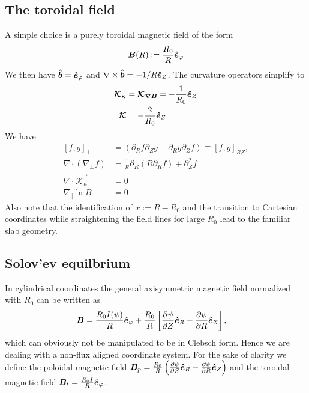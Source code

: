 \subsection{The toroidal field}\label{sec:toroidal}
A simple choice is a purely toroidal magnetic field of the form %
\begin{align}
  {\boldsymbol{B}}(R) := \frac{R_0}{R} \bm{\hat{e}}_\varphi
  \label{}
\end{align}
We then have $\bm{\hat{b}} = \bm{\hat{e}}_\varphi$ and $\nabla\times\bm{\hat{b}} = -1/R\bm{\hat{e}}_Z$. The curvature operators simplify to
\begin{align}
  {\boldsymbol{ \mathcal K_\kappa}} &= {\boldsymbol{ \mathcal K_{\nabla B}}} = -\frac{1}{R_0} \bm{\hat{e}}_Z \\
{\boldsymbol{ \mathcal K}} &= -\frac{2}{R_0}\bm{\hat{e}}_Z
  \label{}
\end{align}
We have
\begin{subequations}
\begin{align}
    [f, g]_\perp &= (\partial_R f\partial_Z g - \partial_R g\partial_Z f) \equiv [f, g]_{RZ}, \\
    \nabla \cdot(\nabla_\perp f) &= \frac{1}{R}\partial_R\left(R\partial_R f\right) + \partial_Z^2f \\
    \nabla\cdot\vec{\mathcal K_{\kappa}}&= 0\\
    \nabla_\parallel \ln B &= 0
    \label{}
\end{align}
\end{subequations}
Also note that the identification of $x:=R-R_0$ and the transition to
Cartesian coordinates while straightening the field lines for large $R_0$
lead to the familiar slab geometry.

\subsection{Solov'ev equilbrium}\label{sec:solovev}
In cylindrical coordinates the general axisymmetric magnetic field normalized with $R_0$ can be written as
\begin{align}
 {\boldsymbol{B}} &= \frac{R_0I(\psi)}{R} \bm{\hat{e}}_{\varphi} + \frac{R_0}{R}\left[\frac{\partial \psi}{\partial Z} \bm{\hat{e}}_R 
         -  \frac{\partial \psi}{\partial R} \bm{\hat{e}}_Z\right] ,
\end{align}
which can obviously not be manipulated to be in Clebsch form. Hence we are dealing with a non-flux aligned coordinate system.
For the sake of clarity we define the poloidal magnetic field \( {\boldsymbol{B}}_p = \frac{R_0}{R}\left( \frac{\partial \psi}{\partial Z}\bm{\hat{e}}_R - \frac{\partial \psi}{\partial R}\bm{\hat{e}}_Z\right)
\) and the toroidal magnetic field \({\boldsymbol{B}}_t =\frac{R_0I}{R} \bm{\hat{e}}_{\varphi}\).



